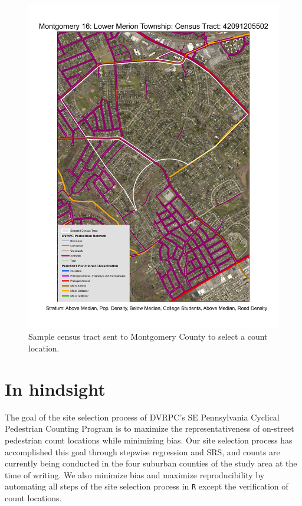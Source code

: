 \documentclass[paper=letterpaper, fontsize=11pt]{scrartcl}
\begin{document}
\FloatBarrier
\begin{figure}[!htbp]
	\centering
	\includegraphics[width=\textwidth]{county-corresp-4.jpg}
	\caption{Sample census tract sent to Montgomery County to select a count location.}
	\label{corresp-4}
\end{figure}
\FloatBarrier

\section{In hindsight}
\label{sec:improvements}

The goal of the site selection process of DVRPC's SE Pennsylvania Cyclical Pedestrian Counting Program is to maximize the representativeness of on-street pedestrian count locations while minimizing bias. Our site selection process has accomplished this goal through stepwise regression and SRS, and counts are currently being conducted in the four suburban counties of the study area at the time of writing. We also minimize bias and maximize reproducibility by automating all steps of the site selection process in \texttt{R} except the verification of count locations. \\
\end{document}
